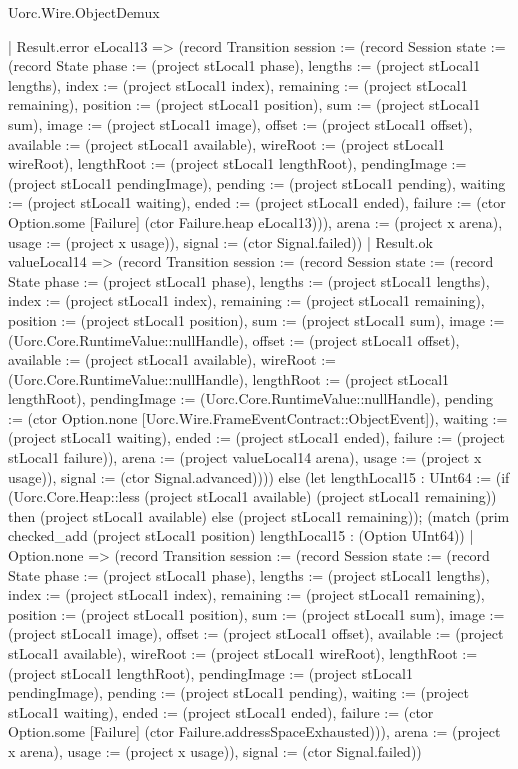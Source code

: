\begin{lexlean}{Uorc.Wire.ObjectDemux}
\begin{semanticmodule}
{          | Result.error eLocal13 => (record Transition {session := (record Session {state := (record State {phase := (project stLocal1 phase), lengths := (project stLocal1 lengths), index := (project stLocal1 index), remaining := (project stLocal1 remaining), position := (project stLocal1 position), sum := (project stLocal1 sum), image := (project stLocal1 image), offset := (project stLocal1 offset), available := (project stLocal1 available), wireRoot := (project stLocal1 wireRoot), lengthRoot := (project stLocal1 lengthRoot), pendingImage := (project stLocal1 pendingImage), pending := (project stLocal1 pending), waiting := (project stLocal1 waiting), ended := (project stLocal1 ended), failure := (ctor Option.some [Failure] (ctor Failure.heap eLocal13))}), arena := (project x arena), usage := (project x usage)}), signal := (ctor Signal.failed)})
          | Result.ok valueLocal14 => (record Transition {session := (record Session {state := (record State {phase := (project stLocal1 phase), lengths := (project stLocal1 lengths), index := (project stLocal1 index), remaining := (project stLocal1 remaining), position := (project stLocal1 position), sum := (project stLocal1 sum), image := (Uorc.Core.RuntimeValue::nullHandle), offset := (project stLocal1 offset), available := (project stLocal1 available), wireRoot := (Uorc.Core.RuntimeValue::nullHandle), lengthRoot := (project stLocal1 lengthRoot), pendingImage := (Uorc.Core.RuntimeValue::nullHandle), pending := (ctor Option.none [Uorc.Wire.FrameEventContract::ObjectEvent]), waiting := (project stLocal1 waiting), ended := (project stLocal1 ended), failure := (project stLocal1 failure)}), arena := (project valueLocal14 arena), usage := (project x usage)}), signal := (ctor Signal.advanced)}))) else (let lengthLocal15 : UInt64 := (if (Uorc.Core.Heap::less (project stLocal1 available) (project stLocal1 remaining)) then (project stLocal1 available) else (project stLocal1 remaining)); (match (prim checked_add (project stLocal1 position) lengthLocal15 : (Option UInt64))
          | Option.none => (record Transition {session := (record Session {state := (record State {phase := (project stLocal1 phase), lengths := (project stLocal1 lengths), index := (project stLocal1 index), remaining := (project stLocal1 remaining), position := (project stLocal1 position), sum := (project stLocal1 sum), image := (project stLocal1 image), offset := (project stLocal1 offset), available := (project stLocal1 available), wireRoot := (project stLocal1 wireRoot), lengthRoot := (project stLocal1 lengthRoot), pendingImage := (project stLocal1 pendingImage), pending := (project stLocal1 pending), waiting := (project stLocal1 waiting), ended := (project stLocal1 ended), failure := (ctor Option.some [Failure] (ctor Failure.addressSpaceExhausted))}), arena := (project x arena), usage := (project x usage)}), signal := (ctor Signal.failed)})
}
\end{semanticmodule}
\end{lexlean}
